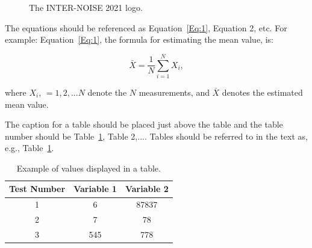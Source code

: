 \begin{figure}[H]
    \centering
    \hspace{20mm}
    \vspace{-1.0mm}
    \caption{The INTER-NOISE 2021 logo.} 
    \label{fig:2}
\vspace{-3.0mm}    
\end{figure}

The equations should be referenced as Equation~\ref{Eq:1}, Equation 2, etc. For example:  Equation~\ref{Eq:1}, the formula for estimating the mean value, is:

\begin{equation}
\bar{X} = \frac{1}{N} \sum_{i=1}^{N} X_i ,
\label{Eq:1}
\end{equation}

\noindent
where $X_i$, $=1,2,...N$ denote the $N$ measurements, and $\bar{X}$ denotes the estimated mean value. 


The caption for a table should be placed just above the table and the table number should be Table~\ref{Tab:1}, Table 2,.... Tables should be referred to in the text as, e.g., Table~\ref{Tab:1}.

\begin{table}[H]
\caption{Example of values displayed in a table.}
\vspace{-5mm}
\label{Tab:1}
\begin{center}
\begin{tabular}{c c c} 
 \hline
 \textbf{Test Number} &  \textbf{Variable 1}& \textbf{Variable 2}  \\ [0.5ex] 
 \hline
 1 & 6 & 87837 \\ 
 \hline
 2 & 7 & 78  \\
 \hline
 3 & 545 & 778 \\ [1ex] 
 \hline
\end{tabular}
\end{center}
\end{table}

